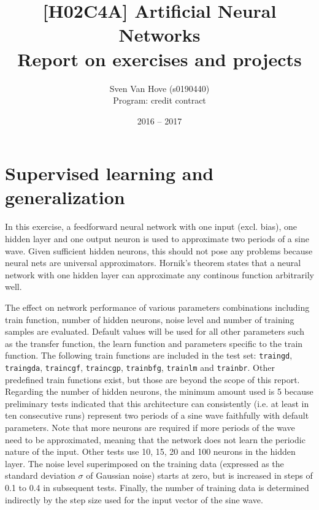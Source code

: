 \documentclass[a4, 10pt, twoside, twocolumn]{article}
\numberwithin{figure}{section}
\begin{document}
\title
{
	[H02C4A] Artificial Neural Networks\\
	Report on exercises and projects
}
\author
{
    Sven Van Hove (s0190440)\\
    Program: credit contract
}
\date{2016 -- 2017}

\maketitle

\section{Supervised learning and generalization}

In this exercise, a feedforward neural network with one input (excl. bias), one hidden layer and one output neuron is used to approximate two periods of a sine wave. Given sufficient hidden neurons, this should not pose any problems because neural nets are universal approximators. Hornik's theorem states that a neural network with one hidden layer can approximate any continous function arbitrarily well.

The effect on network performance of various parameters combinations including train function, number of hidden neurons, noise level and number of training samples are evaluated. Default values will be used for all other parameters such as the transfer function, the learn function and parameters specific to the train function. The following train functions are included in the test set: \texttt{traingd}, \texttt{traingda}, \texttt{traincgf}, \texttt{traincgp}, \texttt{trainbfg}, \texttt{trainlm} and \texttt{trainbr}. Other predefined train functions exist, but those are beyond the scope of this report. Regarding the number of hidden neurons, the minimum amount used is 5 because preliminary tests indicated that this architecture can consistently (i.e. at least in ten consecutive runs) represent two periods of a sine wave faithfully with default parameters. Note that more neurons are required if more periods of the wave need to be approximated, meaning that the network does not learn the periodic nature of the input. Other tests use 10, 15, 20 and 100 neurons in the hidden layer. The noise level superimposed on the training data (expressed as the standard deviation $\sigma$ of Gaussian noise) starts at zero, but is increased in steps of 0.1 to 0.4 in subsequent tests. Finally, the number of training data is determined indirectly by the step size used for the input vector of the sine wave.
\end{document}
